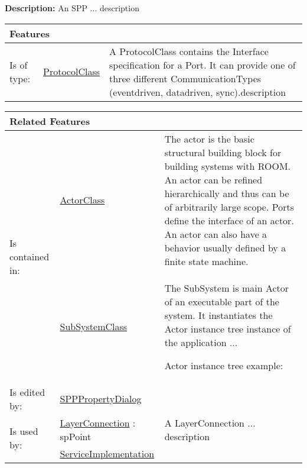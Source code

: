 			\textbf{Description:} An SPP ... description
			
			
			\begingroup
			\renewcommand{\arraystretch}{1.8} %
			\begin{longtable}{p{2.5cm}|p{4cm} p{}}
				\multicolumn{2}{l}{\textbf{\large Features}} & \\
				\hline
			Is of type: & \tabitem \hyperlink{ref:ProtocolClass}{ProtocolClass}  & A ProtocolClass contains the Interface specification for a Port. It can provide one of three different CommunicationTypes (eventdriven, datadriven, sync).description \\
			\hline
			\end{longtable}
			\endgroup
			
			\begingroup
			\renewcommand{\arraystretch}{1.8} %
			\begin{longtable}{p{2.5cm}|p{4cm} p{}}
				\multicolumn{2}{l}{\textbf{\large Related Features}} & \\
				\hline
			\multirow{2}{*}{Is contained in:} & \tabitem \hyperlink{ref:ActorClass}{ActorClass}  & The actor is the basic structural building block for building systems with ROOM. An actor can be refined hierarchically and thus can be of arbitrarily large scope. Ports define the interface of an actor. An actor can also have a behavior usually defined by a finite state machine. \\
			& \tabitem \hyperlink{ref:SubSystemClass}{SubSystemClass}  & The SubSystem is main Actor of an executable part of the system. It instantiates the Actor instance tree instance of the application ...
				
				Actor instance tree example:
			 \\
			\hline
			Is edited by: & \tabitem \hyperlink{ref:SPPPropertyDialog}{SPPPropertyDialog}  & \\
			\hline
			\multirow{2}{*}{Is used by:} & \tabitem \hyperlink{ref:LayerConnection}{LayerConnection} : spPoint & A LayerConnection ... description \\
			& \tabitem \hyperlink{ref:ServiceImplementation}{ServiceImplementation}  &  \\
			\hline
			\end{longtable}
			\endgroup
			
			
			
		\vspace{\baselineskip}
		\vspace{\baselineskip}
		\vspace{\baselineskip}
		
